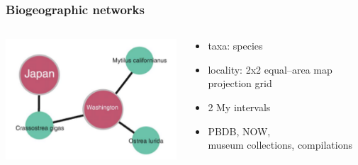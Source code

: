 \documentclass{beamer}
\begin{document}
\begin{frame}
  \frametitle{Biogeographic networks}
  \begin{columns}
    \begin{column}{0.5\textwidth}
      \includegraphics[height = 0.8\textheight, width = \textwidth, keepaspectratio = true]{figure/vilhena}

      \tiny{}
    \end{column}
    \begin{column}{0.5\textwidth}
      \begin{itemize}
        \item taxa: species
        \item locality: 2x2 equal--area map projection grid
        \item 2 My intervals
        \item PBDB, NOW, \\museum collections, compilations
      \end{itemize}
    \end{column}
  \end{columns}
\end{frame}
\end{document}

